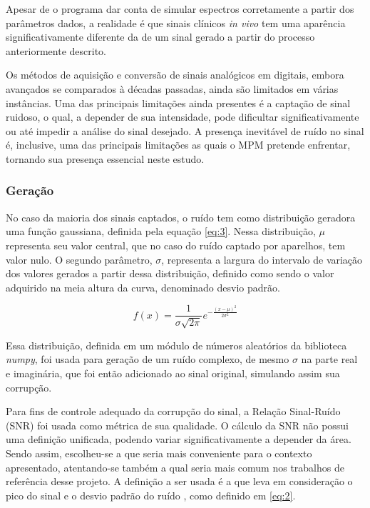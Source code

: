\documentclass{article}
\begin{document}
Apesar de o programa dar conta de simular espectros corretamente a partir dos parâmetros dados, a realidade é que sinais clínicos \textit{in vivo} tem uma aparência significativamente 
diferente da de um sinal gerado a partir do processo anteriormente descrito. 

Os métodos de aquisição e conversão de sinais analógicos em digitais, embora avançados se comparados à décadas passadas, ainda são limitados em várias instâncias. Uma das principais 
limitações ainda presentes é a captação de sinal ruidoso, o qual, a depender de sua intensidade, pode dificultar significativamente ou até impedir a análise do sinal desejado. A presença 
inevitável de ruído no sinal é, inclusive, uma das principais limitações as quais o MPM pretende enfrentar, tornando sua presença essencial neste estudo. 

\subsubsection{Geração}

No caso da maioria dos sinais captados, o ruído tem como distribuição geradora uma função gaussiana, definida pela equação \ref{eq:3}. Nessa distribuição, $\mu$ representa seu valor central, 
que no caso do ruído captado por aparelhos, tem valor nulo. O segundo parâmetro, $\sigma$, representa a largura do intervalo de variação dos valores gerados a partir dessa 
distribuição, definido como sendo o valor adquirido na meia altura da curva, denominado desvio padrão.


\begin{equation} \label{eq:3}
    f(x) = \frac{1}{\sigma \sqrt{2\pi}}e^{-\frac{(x - \mu)^2}{2\sigma ^2}}
\end{equation}

Essa distribuição, definida em um módulo de números aleatórios da biblioteca \textit{numpy}, foi usada para geração de um ruído complexo, de mesmo $\sigma$ na parte real e imaginária, que foi então adicionado ao sinal original, simulando assim sua
corrupção.

Para fins de controle adequado da corrupção do sinal, a Relação Sinal-Ruído (SNR) foi usada como métrica de sua qualidade. O cálculo da SNR não possui uma definição unificada, podendo variar significativamente a depender da área. Sendo assim, 
escolheu-se a que seria mais conveniente para o contexto apresentado, atentando-se também a qual seria mais comum nos trabalhos de referência desse projeto. A definição a ser usada é a que 
leva em consideração o pico do sinal e o desvio padrão do ruído \cite{}, como definido em \ref{eq:2}.  
\end{document}
